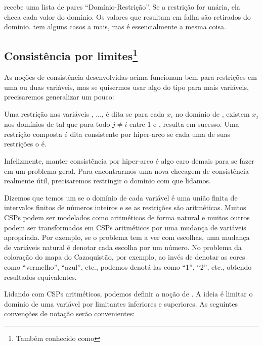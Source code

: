 \documentclass{article}
\begin{document}
\inputminted{prolog}{../Exemplos/Cap9/arc_consistency.pl}\label{lst:arc_consistency}

 recebe uma lista de pares ``Domínio-Restrição''. Se a restrição for unária, ela checa cada valor do domínio.
Os valores que resultam em falha são retirados do domínio.  tem alguns casos a mais, mas é essencialmente a mesma coisa.

\subsection{Consistência por limites\footnote{Também conhecido como }}

As noções de consistência desenvolvidas acima funcionam bem para restrições em uma ou duas variáveis,
mas se quisermos usar algo do tipo para mais variáveis, precisaremos generalizar um pouco:

\begin{definition}
  Uma restrição  nas variáveis , ...,  é dita 
  se para cada $x_i$ no domínio de , existem $x_j$ nos domínios de  tal que
  para todo $j \neq i$ entre 1 e ,  resulta em
  sucesso. Uma restrição composta é dita consistente por hiper-arco se cada uma de suas restrições o é.
\end{definition}

Infelizmente, manter consistência por hiper-arco é algo caro demais para se fazer em um problema geral. Para
encontrarmos uma nova checagem de consistência realmente útil, precisaremos restringir o domínio com que lidamos.

Dizemos que temos um  se o domínio de cada variável é uma união
finita de intervalos finitos de números inteiros e se as restrições são aritméticas. Muitos CSPs
podem ser modelados como aritméticos de forma natural e muitos outros podem ser transformados em
CSPs aritméticos por uma mudança de variáveis apropriada.
Por exemplo, se o problema tem a ver com escolhas, uma mudança de variáveis natural é denotar cada
escolha por um número. No problema da coloração do mapa do Cazaquistão, por exemplo, ao invés de
denotar as cores como ``vermelho'', ``azul'', etc., podemos denotá-las como ``1'', ``2'', etc., obtendo resultados equivalentes.

Lidando com CSPs aritméticos, podemos definir a noção de . A ideia é limitar o domínio
de uma variável por limitantes inferiores e superiores. As seguintes convenções de notação serão convenientes:
\end{document}
